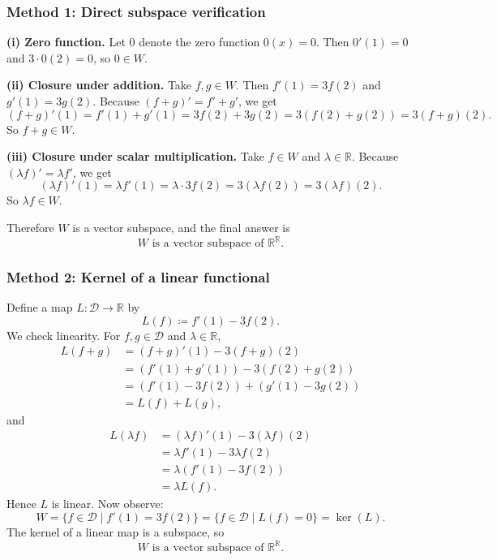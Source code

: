 \documentclass[12pt]{article}
\begin{document}
\subsubsection{Method 1: Direct subspace verification}
\textbf{(i) Zero function.}
Let \(0\) denote the zero function \(0(x)=0\). Then \(0'(1)=0\) and \(3\cdot 0(2)=0\), so \(0\in W\).

\textbf{(ii) Closure under addition.}
Take \(f,g\in W\). Then \(f'(1)=3f(2)\) and \(g'(1)=3g(2)\).
Because \((f+g)'=f'+g'\), we get
\[
(f+g)'(1)=f'(1)+g'(1)=3f(2)+3g(2)=3(f(2)+g(2))=3(f+g)(2).
\]
So \(f+g\in W\).

\textbf{(iii) Closure under scalar multiplication.}
Take \(f\in W\) and \(\lambda\in\mathbb{R}\).
Because \((\lambda f)'=\lambda f'\), we get
\[
(\lambda f)'(1)=\lambda f'(1)=\lambda\cdot 3f(2)=3(\lambda f(2))=3(\lambda f)(2).
\]
So \(\lambda f\in W\).

Therefore \(W\) is a vector subspace, and the final answer is
\[
\boxed{\text{\(W\) is a vector subspace of \(\mathbb{R}^{\mathbb{R}}\).}}
\]

\subsubsection{Method 2: Kernel of a linear functional}
Define a map \(L:\mathcal{D}\to \mathbb{R}\) by
\[
L(f)\coloneqq f'(1)-3f(2).
\]
We check linearity. For \(f,g\in\mathcal{D}\) and \(\lambda\in\mathbb{R}\),
\begin{align*}
L(f+g) &= (f+g)'(1)-3(f+g)(2) \\
&= (f'(1)+g'(1)) - 3(f(2)+g(2)) \\
&= (f'(1)-3f(2)) + (g'(1)-3g(2)) \\
&= L(f)+L(g),
\end{align*}
and
\begin{align*}
L(\lambda f) &= (\lambda f)'(1)-3(\lambda f)(2) \\
&= \lambda f'(1) - 3\lambda f(2) \\
&= \lambda(f'(1)-3f(2))\\
&= \lambda L(f).
\end{align*}
Hence \(L\) is linear. Now observe:
\[
W=\{f\in\mathcal{D}\mid f'(1)=3f(2)\}=\{f\in\mathcal{D}\mid L(f)=0\}=\ker(L).
\]
The kernel of a linear map is a subspace, so
\[
\boxed{\text{\(W\) is a vector subspace of \(\mathbb{R}^{\mathbb{R}}\).}}
\]

\newpage
\end{document}
